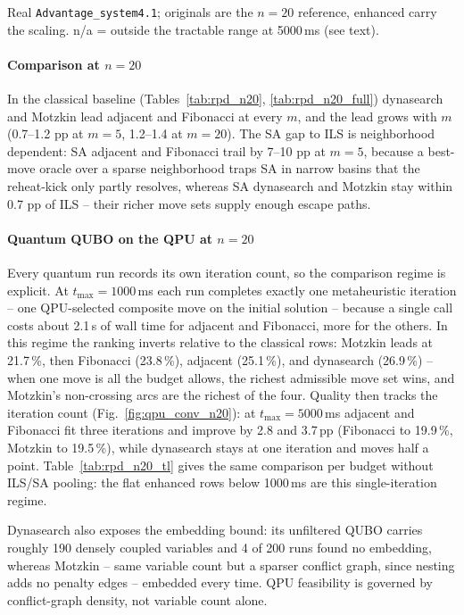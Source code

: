 \documentclass[preprint,12pt,authoryear]{elsarticle}
\begin{document}
\begin{table}[!tp]
\smallskip
\begin{minipage}{0.94\linewidth}\footnotesize
Real \texttt{Advantage\_system4.1}; originals are the $n=20$ reference,
enhanced carry the scaling. n/a = outside the tractable range at
5000\,ms (see text).
\end{minipage}
\end{table}

\paragraph{Comparison at $n = 20$}
In the classical baseline (Tables~\ref{tab:rpd_n20},
\ref{tab:rpd_n20_full}) dynasearch and Motzkin lead adjacent and
Fibonacci at every $m$, and the lead grows with $m$ (0.7--1.2 pp at
$m = 5$, 1.2--1.4 at $m = 20$). The SA gap to ILS is neighborhood
dependent: SA adjacent and Fibonacci trail by 7--10 pp at $m = 5$,
because a best-move oracle over a sparse neighborhood traps SA in
narrow basins that the reheat-kick only partly resolves, whereas SA
dynasearch and Motzkin stay within 0.7 pp of ILS -- their richer
move sets supply enough escape paths.

\paragraph{Quantum QUBO on the QPU at $n = 20$}
Every quantum run records its own iteration count, so the comparison
regime is explicit. At $t_{\max} = 1000$\,ms each run completes exactly
one metaheuristic iteration -- one QPU-selected composite move on the
initial solution -- because a single call costs about 2.1\,s of wall
time for adjacent and Fibonacci, more for the others. In this regime
the ranking inverts relative to the classical rows: Motzkin leads at
21.7\,\%, then Fibonacci (23.8\,\%), adjacent (25.1\,\%), and
dynasearch (26.9\,\%) -- when one move is all the budget allows, the
richest admissible move set wins, and Motzkin's non-crossing arcs are
the richest of the four. Quality then tracks the iteration count
(Fig.~\ref{fig:qpu_conv_n20}): at $t_{\max} = 5000$\,ms adjacent and
Fibonacci fit three iterations and improve by 2.8 and 3.7\,pp
(Fibonacci to 19.9\,\%, Motzkin to 19.5\,\%), while dynasearch stays
at one iteration and moves half a point.
Table~\ref{tab:rpd_n20_tl} gives the same comparison per budget without
ILS/SA pooling: the flat enhanced rows below 1000\,ms are this
single-iteration regime.

Dynasearch also exposes the embedding bound: its unfiltered QUBO
carries roughly 190 densely coupled variables and 4 of 200 runs found
no embedding, whereas Motzkin -- same variable count but a sparser
conflict graph, since nesting adds no penalty edges -- embedded every
time. QPU feasibility is governed by conflict-graph density, not
variable count alone.
\end{document}
